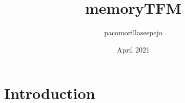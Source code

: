 \documentclass{article}
\title{memoryTFM}
\author{pacomorillasespejo }
\date{April 2021}
\begin{document}
\maketitle

\section{Introduction}
\end{document}
